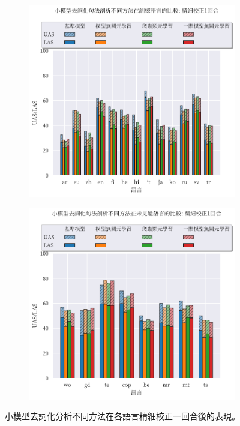 \begin{figure}[htbp]
    \centering
    \begin{subfigure}[t]{0.8\textwidth}
        \centering
        \includegraphics[width=\textwidth]{figs/chapter3/delex/bar_small_full_epoch_1_train_langs.pdf}
    \end{subfigure}
    \vspace{-12pt}
    \begin{subfigure}[t]{0.8\textwidth}
        \centering
        \includegraphics[width=\textwidth]{figs/chapter3/delex/bar_small_full_epoch_1_test_langs.pdf}
    \end{subfigure}
    \caption{小模型去詞化分析不同方法在各語言精細校正一回合後的表現。}
    \label{fig:bar_small_full_epoch_1}
\end{figure}